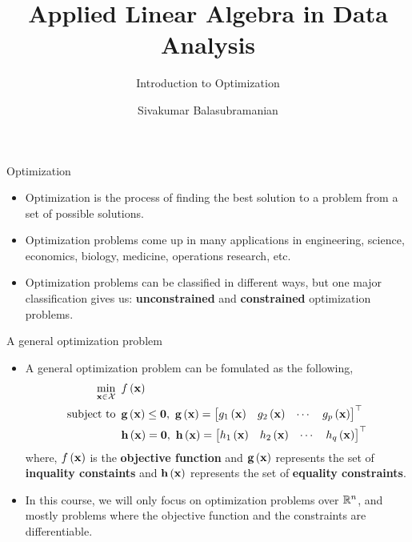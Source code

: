 \documentclass[aspectratio=169]{beamer}
\title{Applied Linear Algebra in Data Analysis}
\subtitle{Introduction to Optimization}
\author{Sivakumar Balasubramanian}
\institute[Christian Medical College] %
{
  \inst{}%
  Department of Bioengineering\\
  Christian Medical College, Bagayam\\
  Vellore 632002
}
\date{}
\let\olditem\item
\renewcommand{\item}{\setlength{\itemsep}{\fill}\olditem}
\def\mf{\ensuremath\mathbf}
\def\mb{\ensuremath\mathbb}
\def\mc{\ensuremath\mathcal}
\def\lp{\ensuremath\left(}
\def\rp{\ensuremath\right)}
\def\bmx{\ensuremath\begin{bmatrix*}[r]}
\def\emx{\ensuremath\end{bmatrix*}}
\def\R{\ensuremath\mb{R}}
\newcommand{\ct}[1]{\lp #1\rp}
\begin{document}


\begin{frame}
  \titlepage
\end{frame}


\begin{frame}[t]{Optimization}
\begin{itemize}
  \item Optimization is the process of finding the best solution to a problem from a set of possible solutions.
  \item Optimization problems come up in many applications in engineering, science, economics, biology, medicine, operations research, etc.
  \item Optimization problems can be classified in different ways, but one major classification gives us: \textbf{unconstrained} and \textbf{constrained} optimization problems.
\end{itemize}
\end{frame}


\begin{frame}[t]{A general optimization problem}
\begin{itemize}
  \item A general optimization problem can be fomulated as the following,
  \[ \begin{split}
      \min_{\mf{x} \in \mc{X}} & \,\,\, f\ct{\mf{x}} \\
      \mathrm{subject \,\, to} & \,\,\, \mf{g}\ct{\mf{x}} \leq \mf{0}, \,\, \mf{g}\ct{\mf{x}} = \bmx g_1\ct{\mf{x}} & g_2\ct{\mf{x}} & \cdots & g_p\ct{\mf{x}}\emx^\top \\
      & \,\,\, \mf{h}\ct{\mf{x}} = \mf{0}, \,\, \mf{h}\ct{\mf{x}} = \bmx h_1\ct{\mf{x}} & h_2\ct{\mf{x}} & \cdots & h_q\ct{\mf{x}}\emx^\top \\
  \end{split} \]
  where, $f\ct{\mf{x}}$ is the \textbf{objective function} and $\mf{g}\ct{\mf{x}}$ represents the set of \textbf{inquality constaints} and $\mf{h}\ct{\mf{x}}$ represents the set of \textbf{equality constraints}.

  \item In this course, we will only focus on optimization problems over $\R^n$, and mostly problems where the objective function and the constraints are differentiable.
\end{itemize}
\end{frame}
\end{document}
